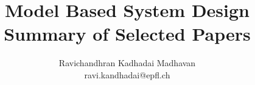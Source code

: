 \documentclass[10pt,journal,a4paper]{IEEEtran}
\begin{document}
\title{Model Based System Design \\ Summary of Selected Papers}

\author{Ravichandhran Kadhadai Madhavan
\\ ravi.kandhadai@epfl.ch }

\maketitle







\end{document}
